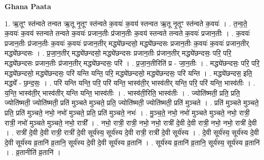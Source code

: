 \documentclass[17pt]{extarticle}
\begin{document}
\textbf{Ghana Paata } \newline

1. ऋ॒तूꣳ स्त॑न्वते तन्वत ऋ॒तू नृ॒तूꣳ स्त॑न्वते क॒वयः॑ क॒वय॑ स्तन्वत ऋ॒तू नृ॒तूꣳ स्त॑न्वते क॒वयः॑ । . त॒न्व॒ते॒ क॒वयः॑ क॒वय॑ स्तन्वते तन्वते क॒वयः॑ प्रजान॒तीः प्र॑जान॒तीः क॒वय॑ स्तन्वते तन्वते क॒वयः॑ प्रजान॒तीः । . क॒वयः॑ प्रजान॒तीः प्र॑जान॒तीः क॒वयः॑ क॒वयः॑ प्रजान॒तीर् मद्ध्ये॑छन्दसो॒ मद्ध्ये॑छन्दसः प्रजान॒तीः क॒वयः॑ क॒वयः॑ प्रजान॒तीर् मद्ध्ये॑छन्दसः । . प्र॒जा॒न॒तीर् मद्ध्ये॑छन्दसो॒ मद्ध्ये॑छन्दसः प्रजान॒तीः प्र॑जान॒तीर् मद्ध्ये॑छन्दसः॒ परि॒ परि॒ मद्ध्ये॑छन्दसः प्रजान॒तीः प्र॑जान॒तीर् मद्ध्ये॑छन्दसः॒ परि॑ । . प्र॒जा॒न॒तीरिति॑ प्र - जा॒न॒तीः । . मद्ध्ये॑छन्दसः॒ परि॒ परि॒ मद्ध्ये॑छन्दसो॒ मद्ध्ये॑छन्दसः॒ परि॑ यन्ति यन्ति॒ परि॒ मद्ध्ये॑छन्दसो॒ मद्ध्ये॑छन्दसः॒ परि॑ यन्ति । . मद्ध्ये॑छन्दस॒ इति॒ मद्ध्ये᳚ - छ॒न्द॒सः॒ । . परि॑ यन्ति यन्ति॒ परि॒ परि॑ यन्ति॒ भास्व॑ती॒र् भास्व॑तीर् यन्ति॒ परि॒ परि॑ यन्ति॒ भास्व॑तीः । . य॒न्ति॒ भास्व॑ती॒र् भास्व॑तीर् यन्ति यन्ति॒ भास्व॑तीः । . भास्व॑ती॒रिति॒ भास्व॑तीः । . ज्योति॑ष्मती॒ प्रति॒ प्रति॒ ज्योति॑ष्मती॒ ज्योति॑ष्मती॒ प्रति॑ मुञ्चते मुञ्चते॒ प्रति॒ ज्योति॑ष्मती॒ ज्योति॑ष्मती॒ प्रति॑ मुञ्चते । . प्रति॑ मुञ्चते मुञ्चते॒ प्रति॒ प्रति॑ मुञ्चते॒ नभो॒ नभो॑ मुञ्चते॒ प्रति॒ प्रति॑ मुञ्चते॒ नभः॑ । . मु॒ञ्च॒ते॒ नभो॒ नभो॑ मुञ्चते मुञ्चते॒ नभो॒ रात्री॒ रात्री॒ नभो॑ मुञ्चते मुञ्चते॒ नभो॒ रात्री᳚ । . नभो॒ रात्री॒ रात्री॒ नभो॒ नभो॒ रात्री॑ दे॒वी दे॒वी रात्री॒ नभो॒ नभो॒ रात्री॑ दे॒वी । . रात्री॑ दे॒वी दे॒वी रात्री॒ रात्री॑ दे॒वी सूर्य॑स्य॒ सूर्य॑स्य दे॒वी रात्री॒ रात्री॑ दे॒वी सूर्य॑स्य । . दे॒वी सूर्य॑स्य॒ सूर्य॑स्य दे॒वी दे॒वी सूर्य॑स्य व्र॒तानि॑ व्र॒तानि॒ सूर्य॑स्य दे॒वी दे॒वी सूर्य॑स्य व्र॒तानि॑ । . सूर्य॑स्य व्र॒तानि॑ व्र॒तानि॒ सूर्य॑स्य॒ सूर्य॑स्य व्र॒तानि॑ । . व्र॒तानीति॑ व्र॒तानि॑ । \newline
\end{document}
